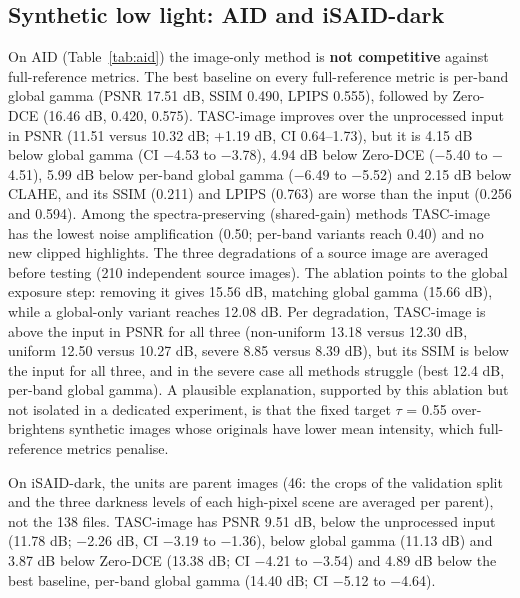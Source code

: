 \documentclass[conference]{IEEEtran}
\begin{document}
\subsection{Synthetic low light: AID and iSAID-dark}
On AID (Table~\ref{tab:aid}) the image-only method is \textbf{not competitive} against full-reference metrics. The best baseline on every full-reference metric is per-band global gamma (PSNR 17.51 dB, SSIM 0.490, LPIPS 0.555), followed by Zero-DCE (16.46 dB, 0.420, 0.575). TASC-image improves over the unprocessed input in PSNR (11.51 versus 10.32 dB; +1.19 dB, CI 0.64--1.73), but it is 4.15 dB below global gamma (CI $-$4.53 to $-$3.78), 4.94 dB below Zero-DCE ($-$5.40 to $-$4.51), 5.99 dB below per-band global gamma ($-$6.49 to $-$5.52) and 2.15 dB below CLAHE, and its SSIM (0.211) and LPIPS (0.763) are worse than the input (0.256 and 0.594). Among the spectra-preserving (shared-gain) methods TASC-image has the lowest noise amplification (0.50; per-band variants reach 0.40) and no new clipped highlights. The three degradations of a source image are averaged before testing (210 independent source images). The ablation points to the global exposure step: removing it gives 15.56 dB, matching global gamma (15.66 dB), while a global-only variant reaches 12.08 dB. Per degradation, TASC-image is above the input in PSNR for all three (non-uniform 13.18 versus 12.30 dB, uniform 12.50 versus 10.27 dB, severe 8.85 versus 8.39 dB), but its SSIM is below the input for all three, and in the severe case all methods struggle (best 12.4 dB, per-band global gamma). A plausible explanation, supported by this ablation but not isolated in a dedicated experiment, is that the fixed target $\tau$ = 0.55 over-brightens synthetic images whose originals have lower mean intensity, which full-reference metrics penalise.

On iSAID-dark, the units are parent images (46: the crops of the validation split and the three darkness levels of each high-pixel scene are averaged per parent), not the 138 files. TASC-image has PSNR 9.51 dB, below the unprocessed input (11.78 dB; $-$2.26 dB, CI $-$3.19 to $-$1.36), below global gamma (11.13 dB) and 3.87 dB below Zero-DCE (13.38 dB; CI $-$4.21 to $-$3.54) and 4.89 dB below the best baseline, per-band global gamma (14.40 dB; CI $-$5.12 to $-$4.64).
\end{document}
